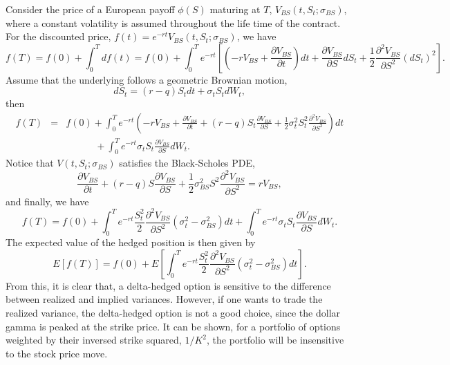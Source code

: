 \documentclass[12pt]{article}
\begin{document}
    Consider the price of a European payoff $\phi(S)$ maturing at $T$, $V_{BS}(t,S_t;\sigma_{BS})$, where a constant volatility
    is assumed throughout the life time of the contract.
    For the discounted price, $f(t)=e^{-rt}V_{BS}(t,S_t;\sigma_{BS})$, we have
    \begin{equation}
      f(T)=f(0)+\int_0^Tdf(t)=f(0)+\int_0^Te^{-rt}\left[\left(-rV_{BS}+\frac{\partial V_{BS}}{\partial t}\right)dt+\frac{\partial V_{BS}}{\partial S}dS_t
              +\frac{1}{2}\frac{\partial^2 V_{BS}}{\partial S^2}\left(dS_t\right)^2\right].
    \end{equation}
    Assume that the underlying follows a geometric Brownian motion,
    \begin{equation}
      dS_t = \left(r-q\right)S_tdt + \sigma_tS_tdW_t,
    \end{equation}
    then
    \begin{eqnarray}
      f(T)&=&f(0)+\int_0^Te^{-rt}\left(-rV_{BS}+\frac{\partial V_{BS}}{\partial t}+\left(r-q\right)S_t\frac{\partial V_{BS}}{\partial S}
                                +\frac{1}{2}\sigma_t^2S_t^2\frac{\partial^2 V_{BS}}{\partial S^2}\right)dt\nonumber\\
          &&\quad\quad\quad+\int_0^Te^{-rt}\sigma_tS_t\frac{\partial V_{BS}}{\partial S}dW_t.
    \end{eqnarray}
    Notice that  $V(t,S_t;\sigma_{BS})$ satisfies the Black-Scholes PDE,
    \begin{equation}
      \frac{\partial V_{BS}}{\partial t}+\left(r-q\right)S\frac{\partial V_{BS}}{\partial S}+\frac{1}{2}\sigma_{BS}^2S^2\frac{\partial^2 V_{BS}}{\partial S^2}
      =rV_{BS},
    \end{equation}
    and finally, we have
    \begin{equation}
      f(T)=f(0)+\int_0^Te^{-rt}\frac{S_t^2}{2}\frac{\partial^2 V_{BS}}{\partial S^2}\left(\sigma_t^2-\sigma_{BS}^2\right)dt+\int_0^Te^{-rt}\sigma_tS_t\frac{\partial V_{BS}}{\partial S}dW_t.
      \label{average}
    \end{equation}
    The expected value of the hedged position is then given by
    \begin{equation}
      E\left[f(T)\right]=f(0)+E\left[\int_0^Te^{-rt}\frac{S_t^2}{2}\frac{\partial^2 V_{BS}}{\partial S^2}\left(\sigma_t^2-\sigma_{BS}^2\right)dt\right].
    \end{equation}
    From this, it is clear that, a delta-hedged option is sensitive to the difference between realized and implied variances.
    However, if one wants to trade
    the realized variance, the delta-hedged option is not a good choice, since the dollar gamma is peaked at the strike price.
    It can be shown, for a portfolio
    of options weighted by their inversed strike squared, $1/K^2$, the portfolio will be insensitive to the stock price move.
\end{document}
